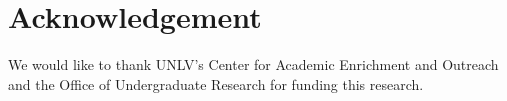 \documentclass[conference]{IEEEtran}
\begin{document}
\section{Acknowledgement}\label{section:acknowledgement}
We would like to thank UNLV's Center for Academic Enrichment and Outreach and the Office of Undergraduate Research for funding this research. 




 
\end{document}
